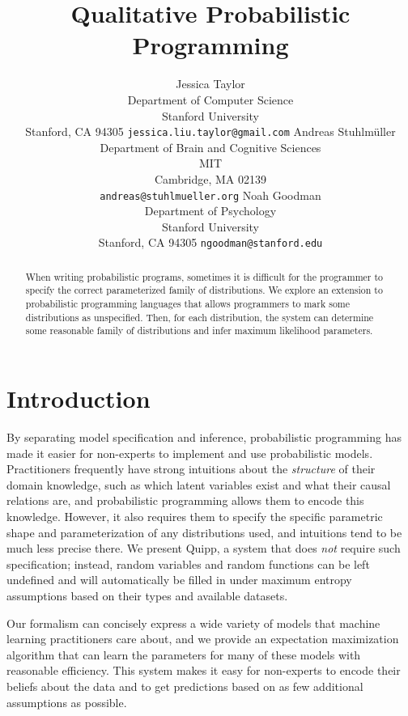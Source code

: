 \documentclass{article}
\title{Qualitative Probabilistic Programming}
\author{
Jessica Taylor \\
Department of Computer Science\\
Stanford University \\
Stanford, CA 94305
\texttt{jessica.liu.taylor@gmail.com}
\And
Andreas Stuhlm\"uller \\
Department of Brain and Cognitive Sciences \\
MIT \\
Cambridge, MA 02139 \\
\texttt{andreas@stuhlmueller.org}
\And
Noah Goodman \\
Department of Psychology \\
Stanford University \\
Stanford, CA 94305
\texttt{ngoodman@stanford.edu}
}
\begin{document}
  \maketitle

  \begin{abstract}
    When writing probabilistic programs, sometimes it is difficult for the programmer to specify the correct
    parameterized family of distributions.  We explore an extension to
    probabilistic programming languages that allows programmers to mark some
    distributions as unspecified.  Then, for each distribution, the system can
    determine some reasonable family of distributions and infer maximum likelihood
    parameters.
  \end{abstract}


  \section{Introduction}

  By separating model specification and inference, probabilistic programming 
  has made it easier for non-experts to implement and use probabilistic models.
  Practitioners frequently have strong intuitions about the {\em structure}
  of their domain knowledge, such as which latent variables exist and what
  their causal relations are, and probabilistic programming allows them to encode
  this knowledge. However, it also requires them to specify the specific parametric
  shape and parameterization of any distributions used, and intuitions tend to
  be much less precise there.
  We present Quipp, a system that does {\em not} require such specification;
  instead, random variables and random functions can be left undefined
  and will automatically be filled in under maximum entropy assumptions
  based on their types and available datasets.
  
  Our formalism can concisely express a wide variety of models that machine
  learning practitioners care about, and we provide an expectation
  maximization algorithm that can learn the parameters for many of
  these models with reasonable efficiency. This system makes it easy
  for non-experts to encode their beliefs about the data and to get
  predictions based on as few additional assumptions as possible.
  
\end{document}
